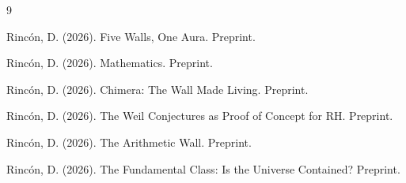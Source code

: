 \documentclass[12pt]{article}
\theoremstyle{definition}
\theoremstyle{remark}
\begin{document}
\begin{thebibliography}{9}

Rinc\'on, D. (2026).
Five Walls, One Aura. Preprint.

Rinc\'on, D. (2026).
Mathematics. Preprint.

Rinc\'on, D. (2026).
Chimera: The Wall Made Living. Preprint.

Rinc\'on, D. (2026).
The Weil Conjectures as Proof of Concept for RH. Preprint.

Rinc\'on, D. (2026).
The Arithmetic Wall. Preprint.

Rinc\'on, D. (2026).
The Fundamental Class: Is the Universe Contained? Preprint.

\end{thebibliography}
\end{document}
